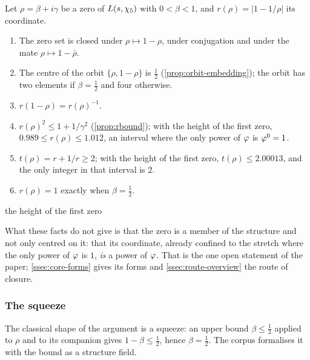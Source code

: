 \begin{proposition}\label{prop:each-zero}
Let $\rho=\beta+i\gamma$ be a zero of $L(s,\chi_5)$ with $0<\beta<1$, and
$r(\rho)=|1-1/\rho|$ its coordinate.
\begin{enumerate}[label=\textup{(\roman*)}]
  \item The zero set is closed under $\rho\mapsto1-\rho$, under conjugation and under
    the mate $\rho\mapsto1-\bar\rho$.
  \item The centre of the orbit $\{\rho,1-\rho\}$ is $\tfrac12$
    (\cref{prop:orbit-embedding}); the orbit has two elements if $\beta=\tfrac12$
    and four otherwise.
  \item $r(1-\rho)=r(\rho)^{-1}$.
  \item $r(\rho)^2\le1+1/\gamma^2$ (\cref{prop:rbound}); with the height of the first
    zero, $0.989\le r(\rho)\le1.012$, an interval where the only power of $\varphi$ is
    $\varphi^0=1$.
  \item $t(\rho)=r+1/r\ge2$; with the height of the first zero, $t(\rho)\le2.00013$, and
    the only integer in that interval is $2$.
  \item $r(\rho)=1$ exactly when $\beta=\tfrac12$.
\end{enumerate}


the height of the first zero
\end{proposition}

What these facts do not give is that the zero is a member of the structure and not
only centred on it: that its coordinate, already confined to the stretch where the only
power of $\varphi$ is $1$, \emph{is} a power of $\varphi$.  That is the one open statement of the paper;
\cref{ssec:core-forms} gives its forms and \cref{ssec:route-overview} the route of closure.

\subsubsection{The squeeze}\label{ssec:squeeze}

The classical shape of the argument is a squeeze: an upper bound
$\beta\le\tfrac12$ applied to $\rho$ and to its companion gives
$1-\beta\le\tfrac12$, hence $\beta=\tfrac12$.  The corpus formalises it with the
bound as a structure field.


